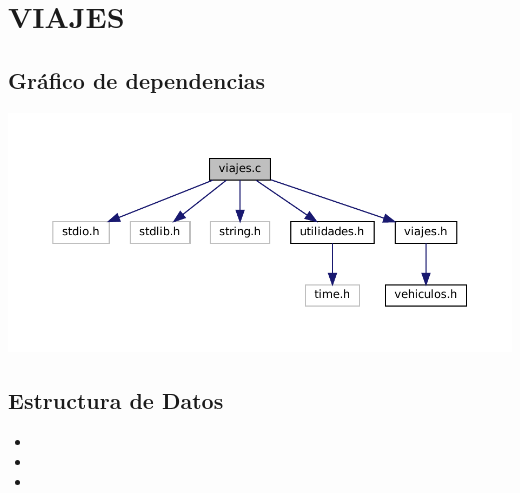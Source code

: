 \section{VIAJES}
\subsection{Gráfico de dependencias}
\includegraphics[width=\textwidth, angle=0]{dep/viajes_include.pdf}
\subsection{Estructura de Datos}
\begin{itemize}
    \item {}
    \item {}
    \item {}
\end{itemize}
